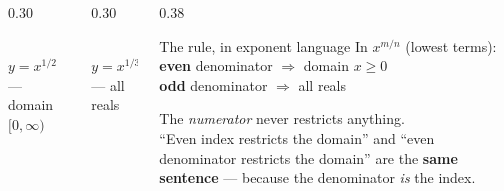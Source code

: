 \documentclass[aspectratio=169, 11pt]{beamer}
\newcommand{\lgrid}[4]{%
  \draw[step=1, linegray!45, thin] (#1,#3) grid (#2,#4);
  \draw[->, thick, charcoal] (#1,0)--(#2,0) node[below right, font=\tiny]{$x$};
  \draw[->, thick, charcoal] (0,#3)--(0,#4) node[left, font=\tiny]{$y$};}
\newcommand{\cbrtpos}[2]{\draw[very thick, forest, domain=#1:#2, samples=70, smooth]
  plot (\x,{pow(\x,1/3)});}
\newcommand{\cbrtneg}[2]{\draw[very thick, forest, domain=#1:#2, samples=70, smooth]
  plot (\x,{-pow(-1*(\x),1/3)});}
\begin{document}
\begin{frame}[t, plain]
  \begin{columns}[T]
    \begin{column}{0.30\textwidth}
      \centering
      \\[2pt]
      {\footnotesize $y=x^{1/2}$ --- domain $[0,\infty)$}
    \end{column}
    \begin{column}{0.30\textwidth}
      \centering
      \\[2pt]
      {\footnotesize $y=x^{1/3}$ --- all reals}
    \end{column}
    \begin{column}{0.38\textwidth}
      \begin{block}{The rule, in exponent language}
        In $x^{m/n}$ (lowest terms): \\[3pt]
        \textbf{even} denominator $\Rightarrow$ domain $x\ge0$ \\[3pt]
        \textbf{odd} denominator $\Rightarrow$ all reals
      \end{block}
      \vspace{2pt}
      {\footnotesize The \emph{numerator} never restricts anything. \\[3pt]
      ``Even index restricts the domain'' and ``even denominator restricts the domain'' are the
      \textbf{same sentence} --- because the denominator \emph{is} the index.}
    \end{column}
  \end{columns}
\end{frame}
\end{document}
